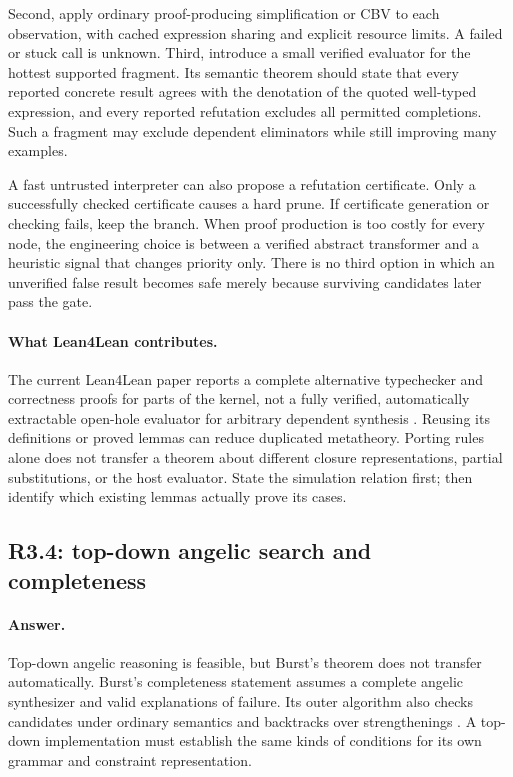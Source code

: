 \documentclass[11pt,a4paper]{article}
\newcommand{\answer}{\paragraph{Answer.}}
\theoremstyle{definition}
\theoremstyle{remark}
\begin{document}
Second, apply ordinary proof-producing simplification or CBV to each observation,
with cached expression sharing and explicit resource limits. A failed or stuck
call is unknown. Third, introduce a small verified evaluator for the hottest
supported fragment. Its semantic theorem should state that every reported
concrete result agrees with the denotation of the quoted well-typed expression,
and every reported refutation excludes all permitted completions. Such a
fragment may exclude dependent eliminators while still improving many examples.

A fast untrusted interpreter can also propose a refutation certificate. Only a
successfully checked certificate causes a hard prune. If certificate generation
or checking fails, keep the branch. When proof production is too costly for every
node, the engineering choice is between a verified abstract transformer and a
heuristic signal that changes priority only. There is no third option in which
an unverified false result becomes safe merely because surviving candidates
later pass the gate.

\paragraph{What Lean4Lean contributes.}
The current Lean4Lean paper reports a complete alternative typechecker and
correctness proofs for parts of the kernel, not a fully verified, automatically
extractable open-hole evaluator for arbitrary dependent synthesis
\cite{lean4lean}. Reusing its definitions or proved lemmas can reduce duplicated
metatheory. Porting rules alone does not transfer a theorem about different
closure representations, partial substitutions, or the host evaluator. State
the simulation relation first; then identify which existing lemmas actually
prove its cases.

\subsection{R3.4: top-down angelic search and completeness}
\answer Top-down angelic reasoning is feasible, but Burst's theorem does not
transfer automatically. Burst's completeness statement assumes a complete
angelic synthesizer and valid explanations of failure. Its outer algorithm also
checks candidates under ordinary semantics and backtracks over strengthenings
\cite{burst}. A top-down implementation must establish the same kinds of
conditions for its own grammar and constraint representation.
\end{document}
